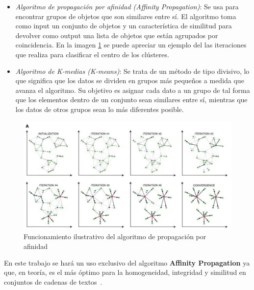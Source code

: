 \documentclass[a4paper, 12pt]{book}
\begin{document}
\begin{itemize}
\item \textit{Algoritmo de propagación por afinidad (Affinity Propagation)}: Se usa para encontrar grupos de objetos que son similares entre sí. El algoritmo toma como input un conjunto de objetos y un característica de similitud para devolver como output una lista de objetos que están agrupados por coincidencia. En la imagen \ref{fig:affinitypropagation} se puede apreciar un ejemplo del las iteraciones que realiza para clasificar el centro de los clústeres.
\item \textit{Algoritmo de K-medias (K-means)}: Se trata de un método de tipo divisivo, lo que significa que los datos se dividen en grupos más pequeños a medida que avanza el algoritmo. Su objetivo es asignar cada dato a un grupo de tal forma que los elementos dentro de un conjunto sean similares entre sí,  mientras que los datos de otros grupos sean lo más diferentes posible.
\end{itemize}

\begin{figure}[!htb]
    \centering
    \includegraphics[width=16cm, keepaspectratio]{img/affinitypropagation.jpg}
    \caption{Funcionamiento ilustrativo del algoritmo de propagación por afinidad}
    \label{fig:affinitypropagation}
\end{figure}

En este trabajo se hará un uso exclusivo del algoritmo \textbf{Affinity Propagation} ya que, en teoría, es el más óptimo para la homogeneidad, integridad y similitud en conjuntos de cadenas de textos~\cite{areed2020python}.

\end{document}
